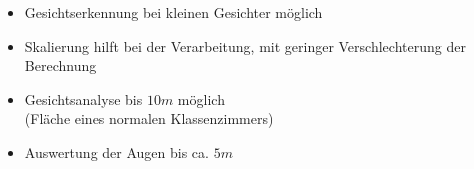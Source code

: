 \begin{frame}
\begin{itemize}
	\item<1-> Gesichtserkennung bei kleinen Gesichter möglich
	\item<1-> Skalierung hilft bei der Verarbeitung, mit geringer Verschlechterung der Berechnung
	\item<1-> Gesichtsanalyse bis $10m$ möglich\\
	(Fläche eines normalen Klassenzimmers) 
	\item<1-> Auswertung der Augen bis ca. $5m$ 
\end{itemize}
\end{frame}